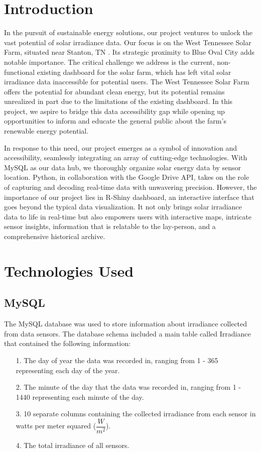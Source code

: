 \documentclass{sigchi}
\begin{document}
\section{Introduction}

In the pursuit of sustainable energy solutions, our project ventures to unlock the vast potential of solar irradiance data. Our focus is on the West Tennessee Solar Farm, situated near Stanton, TN \cite{WTSF}. Its strategic proximity to Blue Oval City adds notable importance. The critical challenge we address is the current, non-functional existing dashboard for the solar farm, which has left vital solar irradiance data inaccessible for potential users. The West Tennessee Solar Farm offers the potential for abundant clean energy, but its potential remains unrealized in part due to the limitations of the existing dashboard. In this project, we aspire to bridge this data accessibility gap while opening up opportunities to inform and educate the general public about the farm's renewable energy potential.


In response to this need, our project emerges as a symbol of innovation and accessibility, seamlessly integrating an array of cutting-edge technologies. With MySQL as our data hub, we thoroughly organize solar energy data by sensor location. Python, in collaboration with the Google Drive API, takes on the role of capturing and decoding real-time data with unwavering precision. However, the importance of our project lies in R-Shiny dashboard, an interactive interface that goes beyond the typical data visualization. It not only brings solar irradiance data to life in real-time but also empowers users with interactive maps, intricate sensor insights, information that is relatable to the lay-person, and a comprehensive historical archive.


\section{Technologies Used}

\subsection{MySQL}
The MySQL database was used to store information about irradiance collected from data sensors. The database schema included a main table called Irradiance that contained the following information:
\begin{itemize}
\item[1.] The day of year the data was recorded in, ranging from 1 - 365 representing each day of the year.
\item[2.] The minute of the day that the data was recorded in, ranging from 1 - 1440 representing each minute of the day.
\item[3.] 10 separate columns containing the collected irradiance from each sensor in watts per meter squared ($\dfrac{W}{m^2}$). 
\item[4.] The total irradiance of all sensors.
\end{itemize}
\end{document}
